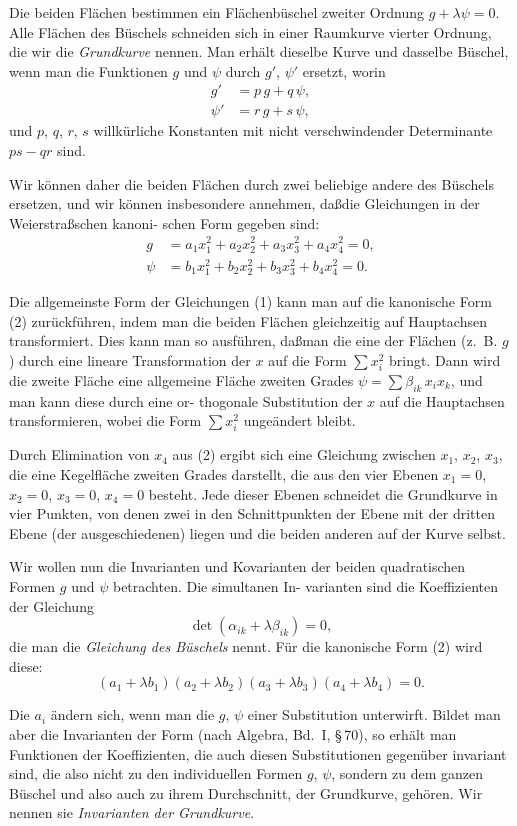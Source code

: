 \documentclass[12pt,a4paper]{book}
\theoremstyle{definition}
\begin{document}
Die beiden Fl\"achen bestimmen ein Fl\"achenb\"uschel zweiter
Ordnung $g + \lambda\psi = 0$. Alle Fl\"achen des B\"uschels schneiden sich
in einer Raumkurve vierter Ordnung, die wir die \emph{Grundkurve}
nennen. Man erh\"alt dieselbe Kurve und dasselbe B\"uschel, wenn
man die Funktionen $g$ und $\psi$ durch $g'$, $\psi'$ ersetzt, worin
\[
\begin{aligned}
g' &= p\,g + q\,\psi,\\
\psi' &= r\,g + s\,\psi,
\end{aligned}
\]
und $p$, $q$, $r$, $s$ willk\"urliche Konstanten mit nicht verschwindender
Determinante $ps - qr$ sind.

Wir k\"onnen daher die beiden Fl\"achen durch zwei beliebige
andere des B\"uschels ersetzen, und wir k\"onnen insbesondere
annehmen, da\ss die Gleichungen in der Weierstra\ss schen kanoni-
schen Form gegeben sind:
\begin{equation}
\begin{aligned}
g &= a_1 x_1^2 + a_2 x_2^2 + a_3 x_3^2 + a_4 x_4^2 = 0,\\
\psi &= b_1 x_1^2 + b_2 x_2^2 + b_3 x_3^2 + b_4 x_4^2 = 0.
\end{aligned}
\tag{2}
\end{equation}

Die allgemeinste Form der Gleichungen (1) kann man auf
die kanonische Form (2) zur\"uckf\"uhren, indem man die beiden
Fl\"achen gleichzeitig auf Hauptachsen transformiert. Dies kann
man so ausf\"uhren, da\ss man die eine der Fl\"achen (z.~B. $g$) durch
eine lineare Transformation der $x$ auf die Form $\sum x_i^2$ bringt.
Dann wird die zweite Fl\"ache eine allgemeine Fl\"ache zweiten
Grades $\psi = \sum \beta_{ik}\,x_i x_k$, und man kann diese durch eine or-
thogonale Substitution der $x$ auf die Hauptachsen transformieren,
wobei die Form $\sum x_i^2$ unge\"andert bleibt.

Durch Elimination von $x_4$ aus (2) ergibt sich eine Gleichung
zwischen $x_1$, $x_2$, $x_3$, die eine Kegelfl\"ache zweiten Grades darstellt,
die aus den vier Ebenen $x_1 = 0$, $x_2 = 0$, $x_3 = 0$, $x_4 = 0$
besteht. Jede dieser Ebenen schneidet die Grundkurve in vier
Punkten, von denen zwei in den Schnittpunkten der Ebene mit
der dritten Ebene (der ausgeschiedenen) liegen und die beiden
anderen auf der Kurve selbst.

Wir wollen nun die Invarianten und Kovarianten der beiden
quadratischen Formen $g$ und $\psi$ betrachten. Die simultanen In-
varianten sind die Koeffizienten der Gleichung
\[
\det(\alpha_{ik} + \lambda\beta_{ik}) = 0,
\]
die man die \emph{Gleichung des B\"uschels} nennt. F\"ur die kanonische
Form (2) wird diese:
\[
(a_1 + \lambda b_1)(a_2 + \lambda b_2)(a_3 + \lambda b_3)(a_4 + \lambda b_4) = 0.
\]

Die $a_i$ \"andern sich, wenn man die $g$, $\psi$ einer Substitution
unterwirft. Bildet man aber die Invarianten der Form (nach
Algebra, Bd.~I, \S\,70), so erh\"alt man Funktionen der Koeffizienten,
die auch diesen Substitutionen gegen\"uber invariant sind, die also
nicht zu den individuellen Formen $g$, $\psi$, sondern zu dem ganzen
B\"uschel und also auch zu ihrem Durchschnitt, der Grundkurve,
geh\"oren. Wir nennen sie \emph{Invarianten der Grundkurve}.
\end{document}
